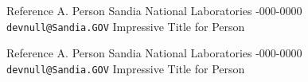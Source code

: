 \documentclass[centered,11pt,overlapped]{res}
\begin{document}
\begin{resume}
{%
Reference A. Person \newline
Sandia National Laboratories -000-0000 \newline
{\tt devnull@Sandia.GOV} \newline
Impressive Title for Person


%
Reference A. Person \newline
Sandia National Laboratories -000-0000 \newline
{\tt devnull@Sandia.GOV} \newline
Impressive Title for Person



}


\end{resume}
\end{document}
